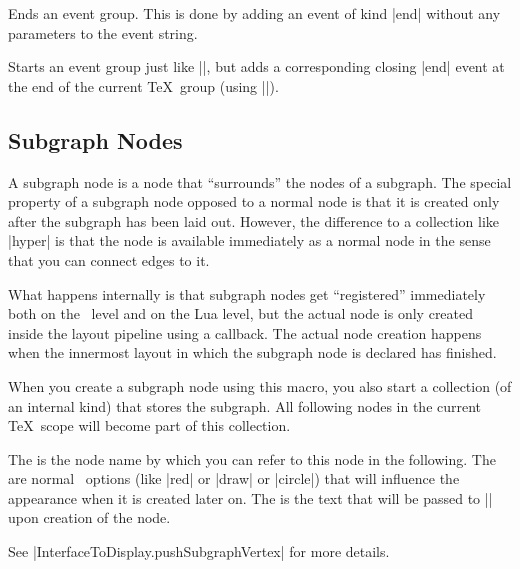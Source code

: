 \begin{command}{\pgfgdendeventgroup}
    Ends an event group. This is done by adding an event of kind |end| without
    any parameters to the event string.
\end{command}

\begin{command}{\pgfgdeventgroup{}}
    Starts an event group just like |\pgfgdbegineventgroup|, but adds a
    corresponding closing |end| event at the end of the current \TeX\ group
    (using |\aftergroup|).
\end{command}


\subsection{Subgraph Nodes}

\begin{command}{\pgfgdsubgraphnode{}}
    A subgraph node is a node that ``surrounds'' the nodes of a subgraph. The
    special property of a subgraph node opposed to a normal node is that it is
    created only after the subgraph has been laid out. However, the difference
    to a collection like |hyper| is that the node is available immediately as a
    normal node in the sense that you can connect edges to it.

    What happens internally is that subgraph nodes get ``registered''
    immediately both on the \pgfname\ level and on the Lua level, but the
    actual node is only created inside the layout pipeline using a callback.
    The actual node creation happens when the innermost layout in which the
    subgraph node is declared has finished.

    When you create a subgraph node using this macro, you also start a
    collection (of an internal kind) that stores the subgraph. All following
    nodes in the current \TeX\ scope will become part of this collection.

    The  is the node name by which you can refer to this node in the
    following. The  are normal \pgfname\ options (like |red|
    or |draw| or |circle|) that will influence the appearance when it is
    created later on. The  is the text that will be passed to
    |\pgfnode| upon creation of the node.

    See |InterfaceToDisplay.pushSubgraphVertex| for more details.
\end{command}

